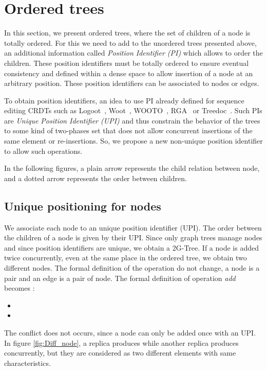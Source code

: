 \documentclass[a4paper]{article}
\begin{document}
\section{Ordered trees}
\label{sec:order}

In this section, we present ordered trees, where the set of children
of a node is totally ordered. For this we need to add to the unordered
trees presented above, an additional information called {\em Position
  Identifier (PI)} which allows to order the children. These position
identifiers must be totally ordered to ensure eventual consistency and
defined within a dense space to allow insertion of a node at an
arbitrary position. These position identifiers can be associated to
nodes or edges.


To obtain position identifiers, an idea to use PI already defined for
sequence editing CRDTs such as Logoot~\cite{weiss10logootundo},
Woot~\cite{oster06data}, WOOTO~\cite{weiss07wooki},
RGA~\cite{roh11replicated} or
Treedoc~\cite{preguica09commutative}. Such PIs are {\em Unique
  Position Identifier (UPI)} and thus constrain the behavior of the
trees to some kind of two-phases set that does not allow concurrent
insertions of the same element or re-insertions. So, we propose a new
non-unique position identifier to allow such operations.



In the following figures, a plain arrow represents the child relation
between node, and a dotted arrow represents the order between
children.

\subsection{Unique positioning for nodes}
 
We associate each node to an unique position identifier (UPI). The
order between the children of a node is given by their UPI.  Since
only graph trees manage nodes and since position identifiers are
unique, we obtain a 2G-Tree. If a node is added twice concurrently,
even at the same place in the ordered tree, we obtain two different
nodes. The formal definition of the operation  do not change, a
node is a pair  and an edge is a pair of node. The formal
definition of operation \textit{add} becomes :
\begin{itemize}
\item 
\item 
\end{itemize}


The conflict  does not occurs, since a node can only be
added once with an UPI. In figure \ref{fig:Diff_node}, a replica
produces  while another replica produces 
concurrently, but they are considered as two different elements with
same characteristics.
\end{document}

